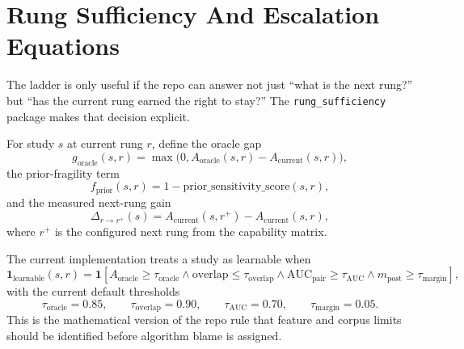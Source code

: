 \documentclass[11pt]{article}
\begin{document}
\section{Rung Sufficiency And Escalation Equations}

The ladder is only useful if the repo can answer not just ``what is the next
rung?'' but ``has the current rung earned the right to stay?'' The
\texttt{rung\_sufficiency} package makes that decision explicit.

For study \(s\) at current rung \(r\), define the oracle gap
\begin{equation}
    g_{\text{oracle}}(s,r)
    =
    \max\big(0, A_{\text{oracle}}(s,r) - A_{\text{current}}(s,r)\big),
\end{equation}
the prior-fragility term
\begin{equation}
    f_{\text{prior}}(s,r)
    =
    1 - \text{prior\_sensitivity\_score}(s,r),
\end{equation}
and the measured next-rung gain
\begin{equation}
    \Delta_{r \rightarrow r^{+}}(s)
    =
    A_{\text{current}}(s,r^{+}) - A_{\text{current}}(s,r),
\end{equation}
where \(r^{+}\) is the configured next rung from the capability matrix.

The current implementation treats a study as learnable when
\begin{equation}
    \mathbf{1}_{\text{learnable}}(s,r)
    =
    \mathbf{1}\!\left[
        A_{\text{oracle}} \ge \tau_{\text{oracle}}
        \land
        \mathrm{overlap} \le \tau_{\text{overlap}}
        \land
        \mathrm{AUC}_{\text{pair}} \ge \tau_{\text{AUC}}
        \land
        m_{\text{post}} \ge \tau_{\text{margin}}
    \right],
\end{equation}
with the current default thresholds
\begin{equation}
    \tau_{\text{oracle}} = 0.85,\qquad
    \tau_{\text{overlap}} = 0.90,\qquad
    \tau_{\text{AUC}} = 0.70,\qquad
    \tau_{\text{margin}} = 0.05.
\end{equation}
This is the mathematical version of the repo rule that feature and corpus
limits should be identified before algorithm blame is assigned.
\end{document}
